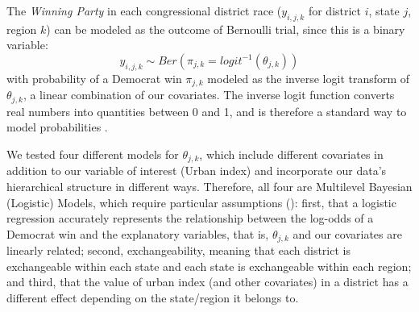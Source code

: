 \documentclass[12pt]{article}
\begin{document}
%
%
%
%

The \textit{Winning Party} in each congressional district race ($y_{i,j,k}$ for district $i$, state $j$, region $k$) can be modeled as the outcome of Bernoulli trial, since this is a binary variable: 
\begin{equation}
	y_{i,j,k} \sim Ber \left( \pi_{j,k} = logit^{-1}(\theta_{j,k})  \right)
\end{equation}
with probability of a Democrat win $\pi_{j,k}$ modeled as the inverse logit transform of $\theta_{j,k}$, a linear combination of our covariates. The inverse logit function converts real numbers into quantities between 0 and 1, and is therefore a standard way to model probabilities \parencite{logitlink}.


We tested four different models for $\theta_{j,k}$, which include different covariates in addition to our variable of interest (Urban index) and incorporate our data's hierarchical structure in different ways. Therefore, all four are Multilevel Bayesian (Logistic) Models, which require particular assumptions (\cite{BDA}): 
first, that a logistic regression accurately represents the relationship between the log-odds of a Democrat win and the explanatory variables, that is, $\theta_{j,k}$ and our covariates are linearly related; second, exchangeability, meaning that each district is exchangeable within each state and each state is exchangeable within each region; and third, that the value of urban index (and other covariates) in a district has a different effect depending on the state/region it belongs to.
\end{document}
